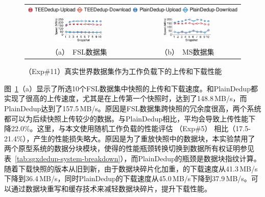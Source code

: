 \begin{figure}[!htb]
  \centering
  \begin{tabular}{@{\ }c@{\ }c}
  \multicolumn{2}{c}{\includegraphics[width=\textwidth]{pic/sgxdedup/expb2_trace_legend.pdf}} \\
  \hspace{-0.1in}
  \includegraphics[width=0.47\textwidth]{pic/sgxdedup/expb2_trace_fsl_plain_sgx.pdf} &
  \includegraphics[width=0.47\textwidth]{pic/sgxdedup/expb2_trace_ms_plain_sgx.pdf}\\
  \mbox{\small （a） FSL数据集} &
  \mbox{\small （b） MS数据集}
  \end{tabular}
  \caption{（Exp\#11）真实世界数据集作为工作负载下的上传和下载性能}
  \label{fig:sgxdedup-tracePerformance}
\end{figure}

图~\ref{fig:sgxdedup-tracePerformance}（a）显示了所选10个FSL数据集中快照的上传和下载速度。\sysnameS 和PlainDedup都实现了很高的上传速度，尤其是在上传第一个快照时，\sysnameS 达到了148.8\,MB/s，而PlainDedup达到了157.5\,MB/s。原因是FSL数据集跨快照的冗余度很高，两个系统都可以为后续快照上传较少的数据。与PlainDedup相比，\sysnameS 平均会导致上传性能下降22.0\%。这里，与本文使用随机工作负载的性能评估 （Exp\#5） 相比（17.5-21.4\%），产生的性能损失略大。原因是为了重放快照中的数据块，本实验禁用了两个原型系统的数据分块模块，使得\sysnameS 的性能瓶颈转换切换到数据所有权证明参见表~\ref{tab:sgxdedup-system-breakdown}），而PlainDedup的瓶颈是数据块指纹计算。随着下载快照的版本从旧到新，由于数据块碎片化\cite{lillibridge13}加重，\sysnameS 的下载速度从41.3\,MB/s下降到36.4\,MB/s，同时PlainDedup的下载速度从45.0\,MB/s下降到37.9\,MB/s。\sysnameS 可以通过数据块重写和缓存\cite{lillibridge13,cao2018ALACC}技术来减轻数据块碎片，提升下载性能。

